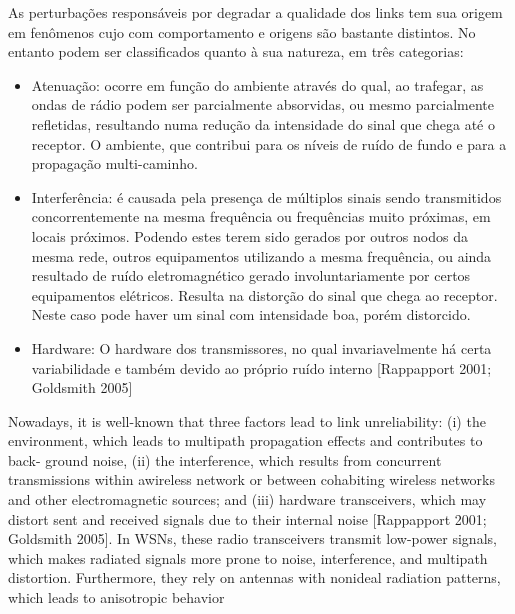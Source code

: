 \documentclass[
	12pt,				%
	openright,			%
	oneside,
	a4paper,			%
	english,			%
	french,				%
	spanish,			%
	brazil				%
	]{abntex2}
\begin{document}
As perturbações responsáveis por degradar a qualidade dos links tem sua origem em fenômenos cujo com comportamento e origens são bastante distintos. No entanto podem ser classificados quanto à sua natureza, em três categorias:
\begin{itemize}
	\item Atenuação: ocorre em função do ambiente através do qual, ao trafegar, as ondas de rádio podem ser parcialmente absorvidas, ou mesmo parcialmente refletidas, resultando numa redução da intensidade do sinal que chega até o receptor. O ambiente, que contribui para os níveis de ruído de fundo e para a propagação multi-caminho.
	\item Interferência: é causada pela presença de múltiplos sinais sendo transmitidos concorrentemente na mesma frequência ou frequências muito próximas, em locais próximos. Podendo estes terem sido gerados por outros nodos da mesma rede, outros equipamentos utilizando a mesma frequência, ou ainda resultado de ruído eletromagnético gerado involuntariamente por certos equipamentos elétricos. Resulta na distorção do sinal que chega ao receptor. Neste caso pode haver um sinal com intensidade boa, porém distorcido.
	\item Hardware: O hardware dos transmissores, no qual invariavelmente há certa variabilidade e também devido ao próprio ruído interno [Rappapport 2001; Goldsmith 2005]
\end{itemize}

Nowadays, it is well-known that three factors lead to link unreliability: (i) the environment, which leads to multipath propagation effects and contributes to back- ground noise, (ii) the interference, which results from concurrent transmissions within awireless network or between cohabiting wireless networks and other electromagnetic sources; and (iii) hardware transceivers, which may distort sent and received signals due to their internal noise [Rappapport 2001; Goldsmith 2005]. In WSNs, these radio transceivers transmit low-power signals, which makes radiated signals more prone to noise, interference, and multipath distortion. Furthermore, they rely on antennas with nonideal radiation patterns, which leads to anisotropic behavior
\end{document}
